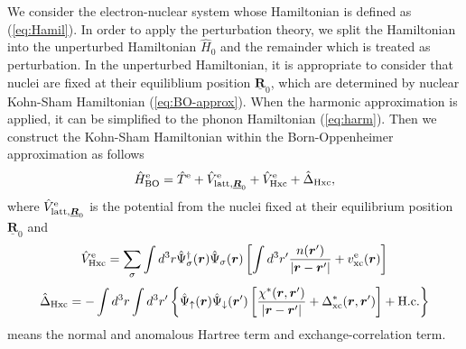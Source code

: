 We consider the electron-nuclear system whose Hamiltonian is defined as (\ref{eq:Hamil}).
In order to apply the perturbation theory, we split the Hamiltonian into the unperturbed
Hamiltonian $\hat{H}_0$ and the remainder which is treated as perturbation.
In the unperturbed Hamiltonian, it is appropriate to consider that nuclei are fixed at their
equiliblium position $\underline{{\bm R}}_0$, which are determined by nuclear 
Kohn-Sham Hamiltonian (\ref{eq:BO-approx}). When the harmonic approximation is applied,
it can be simplified to the phonon Hamiltonian (\ref{eq:harm}).
%
Then we construct the Kohn-Sham Hamiltonian within the Born-Oppenheimer approximation as follows
%
\begin{equation}
	\hat{H}^{\rm e}_{\rm BO} = \hat{T}^{\rm e} + \hat{V}^{\rm e}_{{\rm latt},\underline{{\bm R}}_0}
	+ \hat{V}^{\rm e}_{\rm Hxc} + \hat{\Delta}_{\rm Hxc},
	\label{eq:BO-KS}
\end{equation}
%
where $\hat{V}^{\rm e}_{{\rm latt},\underline{\bm R}_0}$ is the potential from the nuclei fixed at their
equilibrium position $\underline{\bm R}_0$ and 
%
\begin{equation}
	\hat{V}^{\rm e}_{\rm Hxc} = \sum_{\sigma}\int d^3r\hat{\Psi}^{\dag}_{\sigma}({\bm r})
	\hat{\Psi}_{\sigma}({\bm r}) 
	\left[
		\int d^3r' \frac{n({\bm r'})}{|{\bm r}-{\bm r'}|} + v^{\rm e}_{\rm xc}(\bm r)
	\right]
\end{equation}
%
\begin{equation}
\begin{split}
	\hat{\Delta}_{\rm Hxc} = -\int d^3r \int d^3r'
	\left\{
		\hat{\Psi}_\uparrow({\bm r})\hat{\Psi}_\downarrow({\bm r'})
		\left[
			\frac{\chi^\ast({\bm r}, {\bm r'})}{|{\bm r}-{\bm r'}|} 
			+ \Delta^\ast_{\rm xc}({\bm r}, {\bm r'})
		\right]
		+ {\rm H.c.}
	\right\}
	\label{eq:DeltaHxc}
\end{split}
\end{equation}
%
means the normal and anomalous Hartree term and exchange-correlation term.

